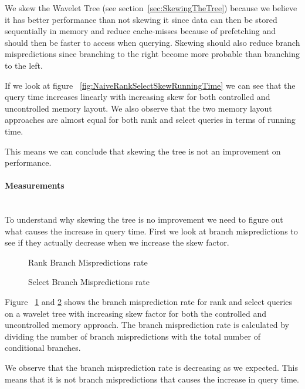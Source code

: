 We skew the Wavelet Tree (see section~\ref{sec:SkewingTheTree}) because we believe it has better performance than not skewing it since data can then be stored sequentially in memory and reduce cache-misses because of prefetching and should then be faster to access when querying. %
Skewing should also reduce branch mispredictions since branching to the right become more probable than branching to the left. 

If we look at figure ~\ref{fig:NaiveRankSelectSkewRunningTime} we can see that the query time increases linearly with increasing skew for both controlled and uncontrolled memory layout. We also observe that the two memory layout approaches are almost equal for both rank and select queries in terms of running time.

This means we can conclude that skewing the tree is not an improvement on performance.

\paragraph{Measurements}~\\
To understand why skewing the tree is no improvement we need to figure out what causes the increase in query time. 
First we look at branch mispredictions to see if they actually decrease when we increase the skew factor.%
\begin{figure}
\caption{Rank Branch Mispredictions rate}
\label{fig:NaiveVsControlledNodeMemorySkewRankQueryBMrate}

\end{figure}%
\begin{figure}
\caption{Select Branch Mispredictions rate}
\label{fig:NaiveVsControlledNodeMemorySkewSelectQueryBMrate}

\end{figure}
 
Figure ~\ref{fig:NaiveVsControlledNodeMemorySkewRankQueryBMrate} and \ref{fig:NaiveVsControlledNodeMemorySkewSelectQueryBMrate} shows the branch misprediction rate for rank and select queries on a wavelet tree with increasing skew factor for both the controlled and uncontrolled memory approach. 
The branch misprediction rate is calculated by dividing the number of branch mispredictions with the total number of conditional branches.

We observe that the branch misprediction rate is decreasing as we expected. 
This means that it is not branch mispredictions that causes the increase in query time. 

